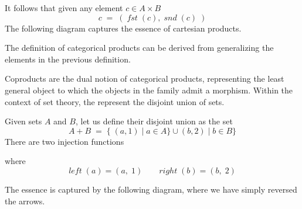It follows that given any element $ c \in A \times B $ $$ c\; =\; (\; fst\; (c),\; snd\; (c)\; )$$ 
The following diagram captures the essence of cartesian products.

\begin{center}
\end{center}

The definition of categorical products can be derived from generalizing the elements in the previous definition.

Coproducts are the dual notion of categorical products, representing the least general object to which the objects in the family admit a morphism. Within the context of set theory, the represent the disjoint union of sets.

Given sets $A$ and $B$, let us define their disjoint union as the set $$A + B\; =\; \{\; (a, 1)\; |\; a \in A\} \cup (b, 2)\; |\; b \in B\} $$ There are two injection functions
\begin{center}
\end{center}
where $$ left\; (a) = (a,\; 1) \qquad right\; (b) = (b,\; 2) $$ 

The essence is captured by the following diagram, where we have simply reversed the arrows.

\begin{center}
\end{center}

